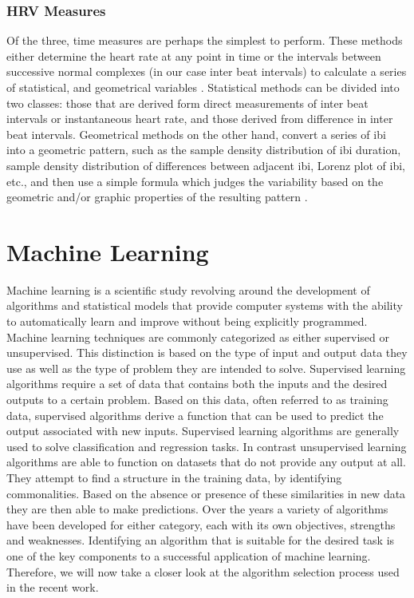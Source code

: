 \subsubsection{HRV Measures}
Of the three, time measures are perhaps the simplest to perform. These methods either determine the heart rate at any point in time or the intervals between successive normal complexes (in our case inter beat intervals) to calculate a series of statistical, and geometrical variables \cite{TheEuropeanSocietyofCardiology1996}. 
Statistical methods can be divided into two classes: those that are derived form direct measurements of inter beat intervals or instantaneous heart rate, and those derived from difference in inter beat intervals. Geometrical methods on the other hand, convert a series of \gls{ibi} into a geometric pattern, such as the sample density distribution
of \gls{ibi} duration, sample density distribution of differences between adjacent \gls{ibi}, Lorenz plot of \gls{ibi}, etc., and then use a simple
formula which judges the variability based on the geometric and/or graphic properties of the resulting pattern \cite{TheEuropeanSocietyofCardiology1996}.


\section{Machine Learning}
Machine learning is a scientific study revolving around the development of algorithms and statistical models that provide computer systems with the ability to automatically learn and improve without being explicitly programmed. Machine learning techniques are commonly categorized as either supervised or unsupervised. This distinction is based on the type of input and output data they use as well as the type of problem they are intended to solve. Supervised learning algorithms require a set of data that contains both the inputs and the desired outputs to a certain problem. Based on this data, often referred to as training data, supervised algorithms derive a function that can be used to predict the output associated with new inputs. Supervised learning algorithms are generally used to solve classification and regression tasks. In contrast unsupervised learning algorithms are able to function on datasets that do not provide any output at all. They attempt to find a structure in the training data, by identifying commonalities. Based on the absence or presence of these similarities in new data they are then able to make predictions. 
Over the years a variety of algorithms have been developed for either category, each with its own objectives, strengths and weaknesses. Identifying an algorithm that is suitable for the desired task is one of the key components to a successful application of machine learning. Therefore, we will now take a closer look at the algorithm selection process used in the recent work. 
  
